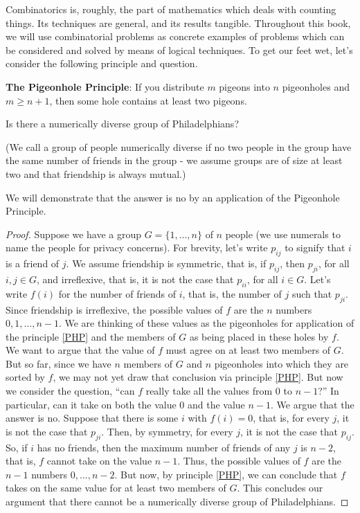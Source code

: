 Combinatorics is, roughly, the part of mathematics which deals with counting things. Its techniques are general, and its results tangible. Throughout this book, we will use combinatorial problems as concrete examples of problems which can be considered and solved by means of logical techniques. To get our feet wet, let's consider the following principle and question. 

\begin{principle}\label{PHP}
\textbf{The Pigeonhole Principle}: If you distribute $m$ pigeons into $n$ pigeonholes and $m\geq n+1$, then some hole contains at least two pigeons.
\end{principle}

\begin{example}
\label{numDiv}
Is there a numerically diverse group of Philadelphians?
\end{example}

(We call a group of people numerically diverse if no two people in the group have the same number of friends in the group - we assume groups are of size at least two and that friendship is always mutual.) 

We will demonstrate that the answer is no by an application of the Pigeonhole Principle. 
\begin{proof}
Suppose we have a group $G=\{1,\ldots,n\}$ of $n$ people (we use numerals to name the people for privacy concerns). For brevity, let's write $p_{ij}$ to signify that $i$ is a friend of $j$. We assume friendship is symmetric, that is, if $p_{ij}$, then $p_{ji}$, for all $i,j\in G$, and irreflexive, that is, it is not the case that $p_{ii}$, for all $i\in G$. Let's write $f(i)$ for the number of friends of $i$, that is, the number of $j$ such that $p_{ji}$. Since friendship is irreflexive, the possible values of $f$ are the $n$ numbers $0, 1,\ldots,n-1$. We are thinking of these values as the pigeonholes for application of the principle \ref{PHP} and the members of $G$ as being placed in these holes by $f$. We want to argue that the value of $f$ must agree on at least two members of $G$. But so far, since we have $n$ members of $G$ and $n$ pigeonholes into which they are sorted by $f$, we may not yet draw that conclusion via principle \ref{PHP}. But now we consider the question, ``can $f$ really take all the values from $0$ to $n-1$?'' In particular, can it take on both the value $0$ and the value $n-1$. We argue that the answer is no. Suppose that there is some $i$ with $f(i)=0$, that is, for every $j$, it is not the case that $p_{ji}$. Then, by symmetry, for every $j$, it is not the case that $p_{ij}$. So, if $i$ has no friends, then the maximum number of friends of any $j$ is $n-2$, that is, $f$ cannot take on the value $n-1$. Thus, the possible values of $f$ are the $n-1$ numbers $0,\ldots,n-2$. But now, by principle \ref{PHP}, we can conclude that $f$ takes on the same value for at least two members of $G$. This concludes our argument that there cannot be a numerically diverse group of Philadelphians. 
\end{proof}

